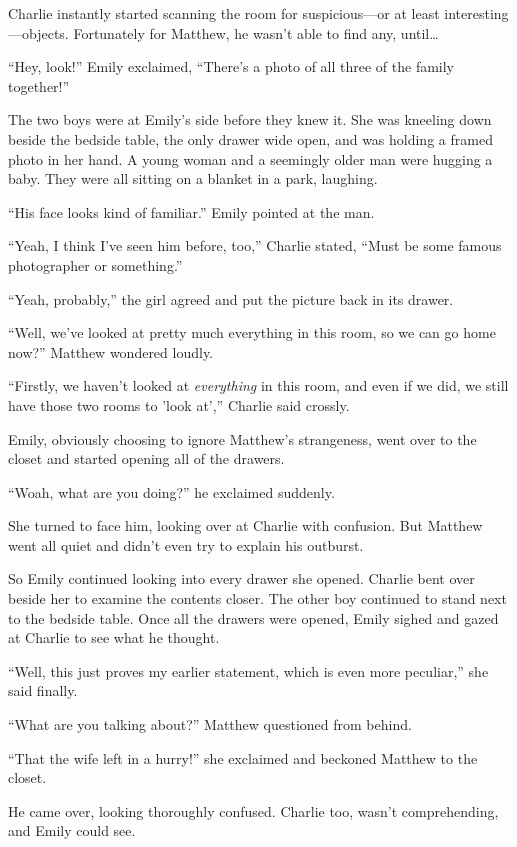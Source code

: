 Charlie instantly started scanning the room for suspicious—or at least interesting—objects. Fortunately for Matthew, he wasn't able to find any, until…

“Hey, look!” Emily exclaimed, “There's a photo of all three of the family together!”

The two boys were at Emily's side before they knew it. She was kneeling down beside the bedside table, the only drawer wide open, and was holding a framed photo in her hand. A young woman and a seemingly older man were hugging a baby. They were all sitting on a blanket in a park, laughing.

“His face looks kind of familiar.” Emily pointed at the man.

“Yeah, I think I've seen him before, too,” Charlie stated, “Must be some famous photographer or something.”

“Yeah, probably,” the girl agreed and put the picture back in its drawer.

“Well, we've looked at pretty much everything in this room, so we can go home now?” Matthew wondered loudly.

“Firstly, we haven't looked at \textit{everything} in this room, and even if we did, we still have those two rooms to 'look at',” Charlie said crossly.

Emily, obviously choosing to ignore Matthew's strangeness, went over to the closet and started opening all of the drawers.

“Woah, what are you doing?” he exclaimed suddenly.

She turned to face him, looking over at Charlie with confusion. But Matthew went all quiet and didn't even try to explain his outburst.

So Emily continued looking into every drawer she opened. Charlie bent over beside her to examine the contents closer. The other boy continued to stand next to the bedside table. Once all the drawers were opened, Emily sighed and gazed at Charlie to see what he thought.

“Well, this just proves my earlier statement, which is even more peculiar,” she said finally.

“What are you talking about?” Matthew questioned from behind.

“That the wife left in a hurry!” she exclaimed and beckoned Matthew to the closet.

He came over, looking thoroughly confused. Charlie too, wasn't comprehending, and Emily could see.

